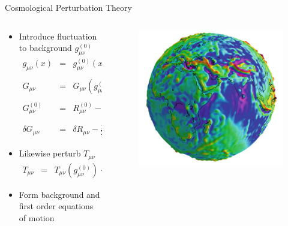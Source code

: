 \documentclass[8pt,aspectratio=1610]{beamer}
\begin{document}
\begin{frame}{Cosmological Perturbation Theory}
	\begin{columns}
		\begin{column}{0.7\linewidth}
			\begin{itemize}
			\item Introduce fluctuation to background $g_{\mu\nu}^{(0)}$
			\begin{eqnarray}
				g_{\mu\nu}(x) &=& g_{\mu\nu}^{(0)}(x) + h_{\mu\nu}(x),\qquad g^{\mu\nu}_{(0)}h_{\mu\nu} \equiv h
				\\ \nonumber\\
				G_{\mu\nu} &=& G_{\mu\nu}(g_{\mu\nu}^{(0)}) + \delta G_{\mu\nu}(h_{\mu\nu})
				\\ \nonumber\\
				G_{\mu\nu}^{(0)} &=& R_{\mu\nu}^{(0)} -\frac{1}{2} g_{\mu\nu}^{(0)} R_\alpha^{(0)\alpha}
				\label{Einzero}
				\\ \nonumber\\
				\delta G_{\mu\nu} &=& \delta R_{\mu\nu} - \frac{1}{2} h_{\mu\nu} R_\alpha^{(0)\alpha} -\frac{1}{2}g_{\mu\nu}\delta R^\alpha{}_\alpha.
			\end{eqnarray}
			\item Likewise perturb $T_{\mu\nu}$
			\begin{eqnarray}
				T_{\mu\nu} &=& T_{\mu\nu}(g_{\mu\nu}^{(0)}) + \delta T_{\mu\nu}(h_{\mu\nu})
			\end{eqnarray}
			\item Form background and first order equations of motion
			\end{itemize}
		\end{column}
		\begin{column}{0.3\linewidth}
			\begin{figure}[t]
				\includegraphics[width=\linewidth]{sphere_perturb.png}

\end{figure}
\end{column}
\end{columns}
\end{frame}
\end{document}
